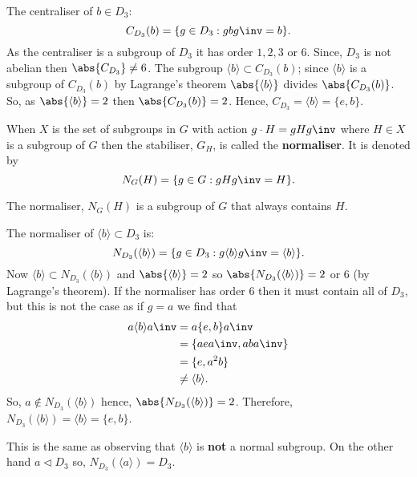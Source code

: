 \documentclass[12pt, a4paper]{article}
\begin{document}
\begin{mdexample}
    The centraliser of \(b \in D_3\):
    \[C_{D_3}(b)=\{g \in D_3 : gbg\inv =b\}.\]
    As the centraliser is a subgroup of \(D_3\) it has order \(1,2,3\) or \(6\). Since, \(D_3\) is not abelian then \(\abs{C_{D_3}} \neq 6\). The subgroup \(\langle b \rangle \subset C_{D_3}(b)\); since \(\langle b \rangle\) is a subgroup of \( C_{D_3}(b)\) by Lagrange's theorem \(\abs{\langle b \rangle}\) divides \(\abs{C_{D_3}(b)}\). So, as \(\abs{\langle b \rangle} =2\) then \(\abs{C_{D_3}(b)}=2\). Hence, \(C_{D_3}= \langle b \rangle =\{e,b\}\).
\end{mdexample}

\begin{definition}
    When \(X\) is the set of subgroups in \(G\) with action \(g \cdot H = gHg\inv\) where \(H \in X\) is a subgroup of \(G\) then the stabiliser, \(G_H\), is called the \textbf{normaliser}. It is denoted by
    \[N_G(H)=\{g \in G : gHg\inv=H\}.\]
\end{definition}

\begin{theorem}
    The normaliser, \(N_G(H)\) is a subgroup of \(G\) that always contains \(H\).
\end{theorem}

\begin{example}
    The normaliser of \(\langle b \rangle \subset D_3\) is:
    \[N_{D_3}(\langle b \rangle) =\{g \in D_3 : g \langle b \rangle g\inv = \langle b\rangle\}.\]
    Now \(\langle b \rangle \subset N_{D_3}(\langle b \rangle)\) and \(\abs{\langle b \rangle}=2\) so \(\abs{N_{D_3}(\langle b \rangle)}=2\) or \(6\) (by Lagrange's theorem). If the normaliser has order \(6\) then it must contain all of \(D_3\), but this is not the case as if \(g=a\) we find that 
    \[\begin{aligned}
        a \langle b \rangle a\inv &=a\{e,b\}a\inv \\
        &= \{aea\inv, aba\inv\} \\
        &=\{e,a^2b\} \\
        &\neq \langle b \rangle.
    \end{aligned}\]
    So, \(a \notin N_{D_3}(\langle b \rangle)\) hence, \(\abs{N_{D_3}(\langle b \rangle)}=2\). Therefore, \(N_{D_3}(\langle b \rangle)=\langle b \rangle=\{e,b\}\).
\end{example}

\begin{mdremark}
    This is the same as observing that \(\langle b \rangle\) is \textbf{not} a normal subgroup. On the other hand \(a \triangleleft D_3\) so, \(N_{D_3}(\langle a \rangle)=D_3\).
\end{mdremark}
\end{document}
